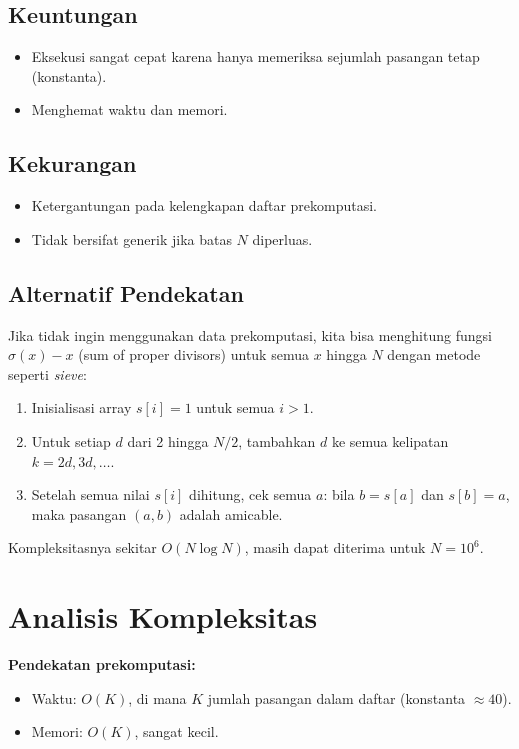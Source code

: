 \documentclass[12pt,a4paper]{article}
\begin{document}
\subsection{Keuntungan}
\begin{itemize}
  \item Eksekusi sangat cepat karena hanya memeriksa sejumlah pasangan tetap (konstanta).
  \item Menghemat waktu dan memori.
\end{itemize}

\subsection{Kekurangan}
\begin{itemize}
  \item Ketergantungan pada kelengkapan daftar prekomputasi.
  \item Tidak bersifat generik jika batas \(N\) diperluas.
\end{itemize}

\subsection{Alternatif Pendekatan}
Jika tidak ingin menggunakan data prekomputasi, kita bisa menghitung fungsi \(\sigma(x)-x\) (sum of proper divisors) untuk semua \(x\) hingga \(N\) dengan metode seperti \textit{sieve}:
\begin{enumerate}
  \item Inisialisasi array \(s[i] = 1\) untuk semua \(i > 1\).
  \item Untuk setiap \(d\) dari 2 hingga \(N/2\), tambahkan \(d\) ke semua kelipatan \(k = 2d, 3d, \ldots\).
  \item Setelah semua nilai \(s[i]\) dihitung, cek semua \(a\): bila \(b = s[a]\) dan \(s[b] = a\), maka pasangan \((a, b)\) adalah amicable.
\end{enumerate}
Kompleksitasnya sekitar \(O(N \log N)\), masih dapat diterima untuk \(N = 10^6\).

\section{Analisis Kompleksitas}
\textbf{Pendekatan prekomputasi:}
\begin{itemize}
  \item Waktu: \(O(K)\), di mana \(K\) jumlah pasangan dalam daftar (konstanta \(\approx 40\)).
  \item Memori: \(O(K)\), sangat kecil.
\end{itemize}
\end{document}
